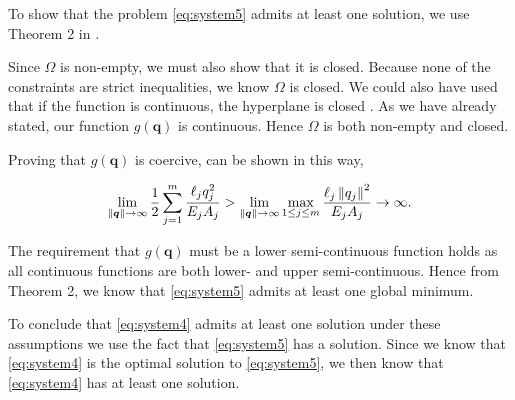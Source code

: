 To show that the problem \eqref{eq:system5} admits at least one solution, we use Theorem 2 in \cite{optThe}.

Since $\Omega$ is non-empty, we must also show that it is closed. Because none of the constraints are strict inequalities, we know $\Omega$ is closed. We could also have used that if the function is continuous, the hyperplane is closed \cite{hyper}. As we have already stated, our function $g(\bm{q})$ is continuous. Hence $\Omega$ is both non-empty and closed.

Proving that $g(\bm{q})$ is coercive, can be shown in this way,

\begin{equation}
\lim_{\left\|\bm{q}\right\|\to\infty} \frac{1}{2}\sum_{j=1}^{m}\frac{\ell_{j}q_{j}^{2}}{E_{j}A_{j}} > 
\lim_{\left\|\bm{q}\right\|\to\infty} \max_{1 \leq j \leq m} \frac{\ell_{j}\left\|{q_{j}}\right\|^{2}}{E_{j}A_{j}} \rightarrow \infty.
\end{equation}

The requirement that $g(\bm{q})$ must be a lower semi-continuous function holds as all continuous functions are both lower- and upper semi-continuous. Hence from Theorem 2, we know that \eqref{eq:system5} admits at least one global minimum.

To conclude that \eqref{eq:system4} admits at least one solution under these assumptions we use the fact that \eqref{eq:system5} has a solution. Since we know that \eqref{eq:system4} is the optimal solution to \eqref{eq:system5}, we then know that \eqref{eq:system4} has at least one solution.